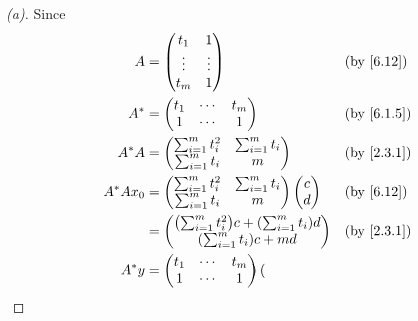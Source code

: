\begin{proof}[(a)]
	Since
	\begin{align*}
		A         & = \begin{pmatrix}
			              t_1    & 1      \\
			              \vdots & \vdots \\
			              t_m    & 1
		              \end{pmatrix}                                                               &  & \by{6.12}    \\
		A^*       & = \begin{pmatrix}
			              t_1 & \cdots & t_m \\
			              1   & \cdots & 1
		              \end{pmatrix}                                                            &  & \by{6.1.5}      \\
		A^* A     & = \begin{pmatrix}
			              \sum_{i = 1}^m t_i^2 & \sum_{i = 1}^m t_i \\
			              \sum_{i = 1}^m t_i   & m
		              \end{pmatrix}                                     &  & \by{2.3.1}                             \\
		A^* A x_0 & = \begin{pmatrix}
			              \sum_{i = 1}^m t_i^2 & \sum_{i = 1}^m t_i \\
			              \sum_{i = 1}^m t_i   & m
		              \end{pmatrix} \begin{pmatrix}
			                            c \\
			                            d
		                            \end{pmatrix}                                     &  & \by{6.12}                \\
		          & = \begin{pmatrix}
			              \pa{\sum_{i = 1}^m t_i^2} c + \pa{\sum_{i = 1}^m t_i} d \\
			              \pa{\sum_{i = 1}^m t_i} c + md
		              \end{pmatrix} &  & \by{2.3.1}                 \\
		A^* y     & = \begin{pmatrix}
			              t_1 & \cdots & t_m \\
			              1   & \cdots & 1
		              \end{pmatrix} \begin{pmatrix}

\end{pmatrix}
\end{align*}
\end{proof}
